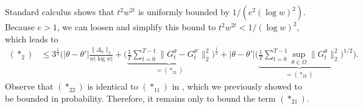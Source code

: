 \documentclass[a4paper, 11pt]{article}
\theoremstyle{definition}
\begin{document}
Standard calculus shows that $t^2 w^{2 t}$ is uniformly bounded by $1 / (e^2 (\log w)^2 )$. 
Because $e > 1$, we can loosen and simplify this bound to $t^2 w^{2 t} < 1 / (\log w)^2$, which leads to
\begin{align}
    (*_2) & \le 3^{\frac{1}{2}} \Bigg( \big| \theta - \theta' \big| \frac{ \big\| \Delta_0 \big\|_2 }{ w | \log w | } + \bigg( \underbrace{ \frac{1}{T} \sum_{t=0}^{T-1} \big\| G_t^\theta - G_t^{\theta'} \big\|_2^2 }_{ = (*_{21}) } \bigg)^{\frac{1}{2}} + \big| \theta - \theta' \big| \bigg( \underbrace{ \frac{1}{T} \sum_{t=0}^{T-1} \sup_{\theta \in \Omega} \big\| G_t^{\theta} \big\|_2^2 }_{ = (*_{22}) } \bigg)^{1/2} \Bigg) . \label{eq:item_2_Lipschitz}
\end{align}
Observe that $(*_{22})$ is identical to $(*_{11})$ in , which we previously showed to be bounded in probability.
Therefore, it remains only to bound the term $(*_{21})$.
\end{document}
